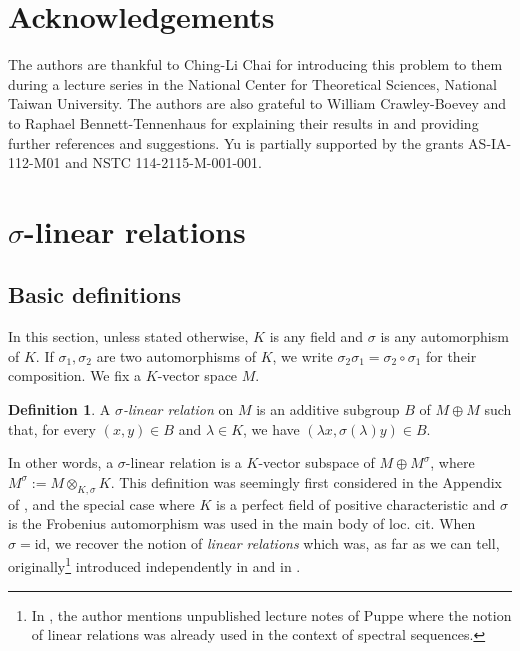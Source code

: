 \documentclass[12pt]{amsart}
\theoremstyle{definition}
\newtheorem{definition}[theorem]{Definition}
\newcommand{\<}{\langle}   %
\renewcommand{\>}{\rangle} %
\begin{document}

\section*{Acknowledgements}

The authors are thankful to Ching-Li Chai for introducing this problem to them during a lecture series in the National Center for Theoretical Sciences, National Taiwan University. The authors are also grateful to William Crawley-Boevey and to Raphael Bennett-Tennenhaus for explaining their results in \cite{clannishalgebras:2024} and providing further references and suggestions. Yu is partially supported by the grants AS-IA-112-M01 and NSTC 114-2115-M-001-001.

\section{$\sigma$-linear relations} \label{Section1}
\subsection{Basic definitions}

In this section, unless stated otherwise, $K$ is any field and $\sigma$ is any automorphism of $K$. If $\sigma_1,\sigma_2$ are two automorphisms of $K$, we write $\sigma_2\sigma_1 = \sigma_2\circ\sigma_1$ for their composition. We fix a $K$-vector space $M$. 

\begin{definition}
A \textit{$\sigma$-linear relation} on $M$ is an additive subgroup $B$ of $M\oplus M$ such that, for every $(x,y) \in B$ and $\lambda \in K$, we have $(\lambda x,\sigma(\lambda)y)\in B$.
\end{definition}

In other words, a $\sigma$-linear relation is a $K$-vector subspace of $M\oplus M^{\sigma}$, where $M^{\sigma} := M\otimes_{K,\sigma} K$. This definition was seemingly first considered in the Appendix of \cite{kraft:1975}, and the special case where $K$ is a perfect field of positive characteristic and $\sigma$ is the Frobenius automorphism was used in the main body of loc. cit. When $\sigma = \mathrm{id}$, we recover the notion of \textit{linear relations} which was, as far as we can tell, originally\footnote{In \cite{maclane:1961}, the author mentions unpublished lecture notes of Puppe where the notion of linear relations was already used in the context of spectral sequences.} introduced independently in \cite{maclane:1961} and in \cite{arens:1961}.
\end{document}
